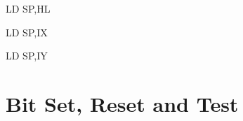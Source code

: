 \documentclass[twoside,openright,a4paper]{book}
\begin{document}
\begin{instrtable}
	\begin{instruction}{LD SP,HL} 
			\Flags{\FN}{\FN}{\FN}{\FN}{\FN}{\FN}
	\end{instruction}

	\begin{instruction}{LD SP,IX} 
			\Flags{\FN}{\FN}{\FN}{\FN}{\FN}{\FN}
		\SkipToOpCode 
	\end{instruction}

	\begin{lastinstruction}{LD SP,IY} 
			\Flags{\FN}{\FN}{\FN}{\FN}{\FN}{\FN}
		\SkipToOpCode 
	\end{lastinstruction}

\end{instrtable}


\section{Bit Set, Reset and Test}
\end{document}
